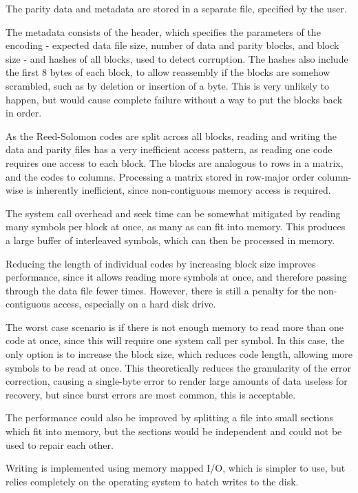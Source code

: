 The parity data and metadata are stored in a separate file, specified by the user.

The metadata consists of the header, which specifies the parameters of the encoding - expected data file size, number of data and parity blocks, and block size - and hashes of all blocks, used to detect corruption.
The hashes also include the first 8 bytes of each block, to allow reassembly if the blocks are somehow scrambled, such as by deletion or insertion of a byte. This is very unlikely to happen, but would cause complete failure without a way to put the blocks back in order.

As the Reed-Solomon codes are split across all blocks, reading and writing the data and parity files has a very inefficient access pattern, as reading one code requires one access to each block.
The blocks are analogous to rows in a matrix, and the codes to columns. Processing a matrix stored in row-major order column-wise is inherently inefficient, since non-contiguous memory access is required.

The system call overhead and seek time can be somewhat mitigated by reading many symbols per block at once, as many as can fit into memory.
This produces a large buffer of interleaved symbols, which can then be processed in memory.

Reducing the length of individual codes by increasing block size improves performance, since it allows reading more symbols at once, and therefore passing through the data file fewer times.
However, there is still a penalty for the non-contiguous access, especially on a hard disk drive.

The worst case scenario is if there is not enough memory to read more than one code at once, since this will require one system call per symbol.
In this case, the only option is to increase the block size, which reduces code length, allowing more symbols to be read at once.
This theoretically reduces the granularity of the error correction, causing a single-byte error to render large amounts of data useless for recovery, but since burst errors are most common, this is acceptable.

The performance could also be improved by splitting a file into small sections which fit into memory, but the sections would be independent and could not be used to repair each other.

Writing is implemented using memory mapped I/O, which is simpler to use, but relies completely on the operating system to batch writes to the disk.

